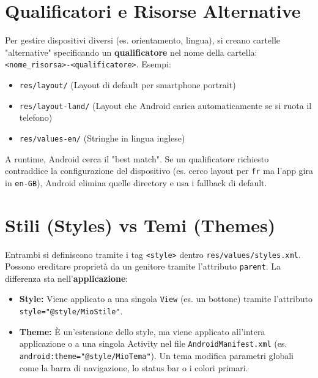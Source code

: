 \section{Qualificatori e Risorse Alternative}
Per gestire dispositivi diversi (es.
orientamento, lingua), si creano cartelle "alternative" specificando un \textbf{qualificatore} nel nome della cartella: \texttt{<nome\_risorsa>-<qualificatore>}.
Esempi:
\begin{itemize}
    \item \texttt{res/layout/} (Layout di default per smartphone portrait)
    \item \texttt{res/layout-land/} (Layout che Android carica automaticamente se si ruota il telefono)
    \item \texttt{res/values-en/} (Stringhe in lingua inglese)
\end{itemize}
A runtime, Android cerca il "best match".
Se un qualificatore richiesto contraddice la configurazione del dispositivo (es. cerco layout per \texttt{fr} ma l'app gira in \texttt{en-GB}), Android elimina quelle directory e usa i fallback di default.

\section{Stili (Styles) vs Temi (Themes)}
Entrambi si definiscono tramite i tag \texttt{<style>} dentro \texttt{res/values/styles.xml}.
Possono ereditare proprietà da un genitore tramite l'attributo \texttt{parent}.
La differenza sta nell'\textbf{applicazione}:
\begin{itemize}
    \item \textbf{Style:} Viene applicato a una singola \texttt{View} (es. un bottone) tramite l'attributo \texttt{style="@style/MioStile"}.
    \item \textbf{Theme:} È un'estensione dello style, ma viene applicato all'intera applicazione o a una singola
    Activity nel file \texttt{AndroidManifest.xml} (es. \texttt{android:theme="@style/MioTema"}).
    Un tema modifica parametri globali come la barra di navigazione, lo status bar o i colori primari.
\end{itemize}

